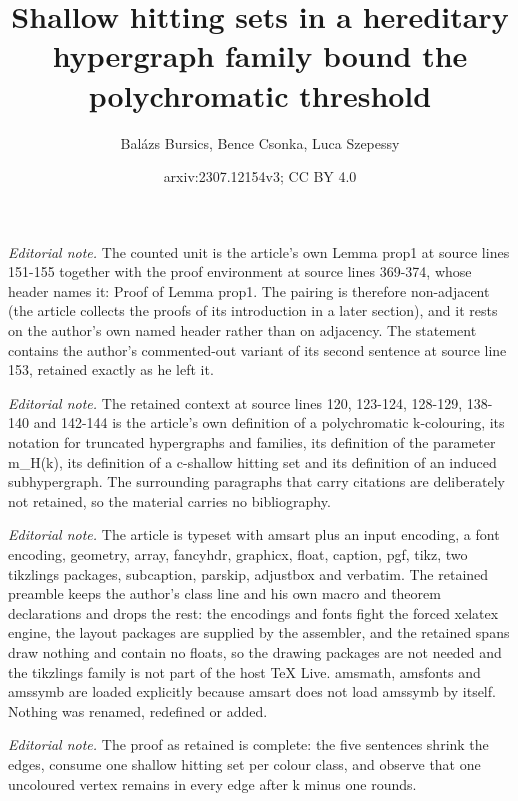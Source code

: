 \documentclass[11pt,oneside]{amsart}
\title{Shallow hitting sets in a hereditary hypergraph family bound the polychromatic threshold}
\author{Balázs Bursics, Bence Csonka, Luca Szepessy}
\date{arxiv:2307.12154v3; CC BY 4.0}
\begin{document}
\maketitle
\noindent\textit{Editorial note.} The counted unit is the article's own Lemma prop1 at source lines 151-155 together with the proof environment at source lines 369-374, whose header names it: Proof of Lemma prop1. The pairing is therefore non-adjacent (the article collects the proofs of its introduction in a later section), and it rests on the author's own named header rather than on adjacency. The statement contains the author's commented-out variant of its second sentence at source line 153, retained exactly as he left it.\par\medskip
\noindent\textit{Editorial note.} The retained context at source lines 120, 123-124, 128-129, 138-140 and 142-144 is the article's own definition of a polychromatic k-colouring, its notation for truncated hypergraphs and families, its definition of the parameter m\_H(k), its definition of a c-shallow hitting set and its definition of an induced subhypergraph. The surrounding paragraphs that carry citations are deliberately not retained, so the material carries no bibliography.\par\medskip
\noindent\textit{Editorial note.} The article is typeset with amsart plus an input encoding, a font encoding, geometry, array, fancyhdr, graphicx, float, caption, pgf, tikz, two tikzlings packages, subcaption, parskip, adjustbox and verbatim. The retained preamble keeps the author's class line and his own macro and theorem declarations and drops the rest: the encodings and fonts fight the forced xelatex engine, the layout packages are supplied by the assembler, and the retained spans draw nothing and contain no floats, so the drawing packages are not needed and the tikzlings family is not part of the host TeX Live. amsmath, amsfonts and amssymb are loaded explicitly because amsart does not load amssymb by itself. Nothing was renamed, redefined or added.\par\medskip
\noindent\textit{Editorial note.} The proof as retained is complete: the five sentences shrink the edges, consume one shallow hitting set per colour class, and observe that one uncoloured vertex remains in every edge after k minus one rounds.\par\medskip
\end{document}
